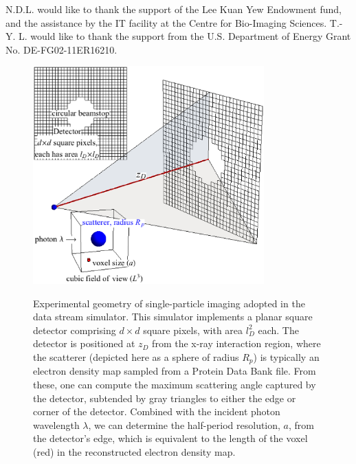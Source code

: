 \documentclass[]{iucr}              %
\begin{document}
N.D.L. would like to thank the support of the Lee Kuan Yew Endowment fund, and the assistance by the IT facility at the Centre for Bio-Imaging Sciences. T.-Y. L. would like to thank the support from the U.S. Department of Energy Grant No. DE-FG02-11ER16210.






\begin{figure}
\caption{Experimental geometry of single-particle imaging adopted in the data stream simulator. This simulator implements a planar square detector comprising $d\times d$ square pixels, with area $l_D^2$ each. The detector is positioned at $z_D$ from the x-ray interaction region, where the scatterer (depicted here as a sphere of radius $R_p$) is typically an electron density map sampled from a Protein Data Bank file. From these, one can compute the maximum scattering angle captured by the detector, subtended by gray triangles to either the edge or corner of the detector. Combined with the incident photon wavelength $\lambda$,  we can determine the half-period resolution, $a$, from the detector's edge, which is equivalent to the length of the voxel (red) in the reconstructed electron density map.}
\includegraphics[width=3.5in]{figures/geometry.eps} \label{fig:expGeometry}
\end{figure}
\end{document}
